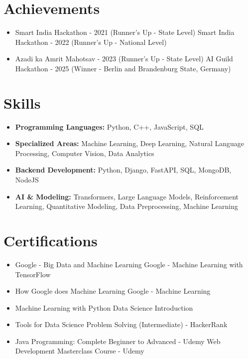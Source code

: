 \documentclass[a4paper,10pt]{article}
\begin{document}
\section*{Achievements}
\begin{itemize}
\item Smart India Hackathon - 2021 (Runner's Up - State Level) \hfill Smart India Hackathon - 2022 (Runner's Up - National Level)
\item Azadi ka Amrit Mahotsav - 2023 (Runner's Up - State Level) \hfill AI Guild Hackathon - 2025 (Winner - Berlin and Brandenburg State, Germany)
\end{itemize}

\section*{Skills}
\begin{itemize}
  \item \textbf{Programming Languages:} Python, C++, JavaScript, SQL
  \item \textbf{Specialized Areas:} Machine Learning, Deep Learning, Natural Language Processing, Computer Vision, Data Analytics
  \item \textbf{Backend Development:} Python, Django, FastAPI, SQL, MongoDB, NodeJS
  \item \textbf{AI \& Modeling:} Transformers, Large Language Models, Reinforcement Learning, Quantitative Modeling, Data Preprocessing, Machine Learning
\end{itemize}

\section*{Certifications}
\begin{itemize}
\item Google - Big Data and Machine Learning \hfill Google - Machine Learning with TensorFlow
\item How Google does Machine Learning \hfill Google - Machine Learning
\item Machine Learning with Python \hfill Data Science Introduction
\item Tools for Data Science \hfill Problem Solving (Intermediate) - HackerRank
\item Java Programming: Complete Beginner to Advanced - Udemy \hfill Web Development Masterclass Course - Udemy
\end{itemize}
\end{document}
